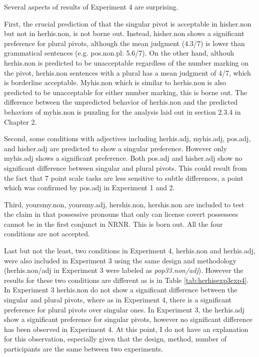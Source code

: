 \documentclass[
  11pt          %
  ,letterpaper  %
  ,center       %
  ,noupper      %
  ]{uconnthesis2}
\begin{document}
Several aspects of results of Experiment 4 are surprising.

First, the crucial prediction of \citealt{Shen:ip2} that the singular pivot is acceptable in hisher.non but not in herhis.non, is not borne out. Instead, hisher.non shows a significant preference for plural pivots, although the mean judgment (4.3/7) is lower than grammatical sentences (e.g. pos.non.pl: 5.6/7). On the other hand, althouh herhis.non is predicted to be unacceptable regardless of the number marking on the pivot, herhis.non sentences with a plural has a mean judgment of 4/7, which is borderline acceptable. Myhis.non which is similar to herhis.non is also predicted to be unacceptable for either number marking, this is borne out. The difference between the unpredicted behavior of herhis.non and the predicted behaviors of myhis.non is puzzling for the analysis laid out in section 2.3.4 in Chapter 2.

Second, some conditions with adjectives including herhis.adj, myhis.adj, pos.adj, and hisher.adj are predicted to show a singular preference. However only myhis.adj shows a significant preference. Both pos.adj and hisher.adj show no significant difference between singular and plural pivots. This could result from the fact that 7 point scale tasks are less sensitive to subtle differences, a point which was confirmed by pos.adj in Experiment 1 and 2.

Third, yoursmy.non, yoursmy.adj, hershis.non, hershis.non are included to test the claim in \citealt{Shen:ip2} that possessive pronouns that only can license covert possessees cannot be in the first conjunct in NRNR. This is born out. All the four conditions are not accepted. %

Last but not the least, two conditions in Experiment 4, herhis.non and herhis.adj, were also included in Experiment 3 using the same design and methodology (herhis.non/adj in Experiment 3 were labeled as \textit{pop33.non/adj}). However the results for these two conditions are different as is in Table \ref{tab:herhisexp3exp4}. In Experiment 3 herhis.non do not show a significant difference between the singular and plural pivots, where as in Experiment 4, there is a significant preference for plural pivots over singular ones. In Experiment 3, the herhis.adj show a significant preference for singular pivots, however no significant difference has been observed in Experiment 4. At this point, I do not have an explanation for this observation, especially given that the design, method, number of participants are the same between two experiments.
\end{document}
